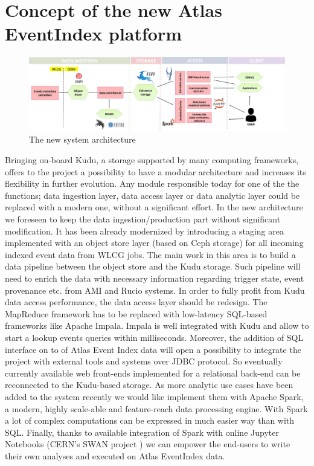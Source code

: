 \documentclass{webofc}
\begin{document}
\section{Concept of the new Atlas EventIndex platform}
\label{sec-4}
\begin{figure}[h]
\centering
\includegraphics[width=\linewidth,clip]{architecture.jpg}
\caption{The new system architecture}
\label{fig:arch}
\end{figure}
Bringing on-board Kudu, a storage supported by many computing frameworks, offers to the project a possibility to have a modular architecture and increases its flexibility in further evolution. Any module responsible today for one of the the functions; data ingestion layer, data access layer or data analytic layer could be replaced with a modern one, without a significant effort. \newline
In the new architecture we foreseen to keep the data ingestion/production part without significant modification. It has been already modernized by introducing a staging area implemented with an object store layer \cite{CEPH} (based on Ceph storage) for all incoming indexed event data from WLCG \cite{WCG} jobs. The main work in this area is to build a data pipeline between the object store and the Kudu storage. Such pipeline will need to enrich the data with necessary information regarding trigger state, event provenance etc. from AMI \cite{AMI} and Rucio \cite{Rucio} systems. \newline
In order to fully profit from Kudu data access performance, the data access layer should be redesign. The MapReduce framework has to be replaced with low-latency SQL-based frameworks like Apache Impala. Impala is well integrated with Kudu and allow to start a lookup events queries within milliseconds. Moreover, the addition of SQL interface on to of Atlas Event Index data will open a possibility to integrate the project with external tools and systems over JDBC protocol. So eventually currently available web front-ends implemented for a relational back-end can be reconnected to the Kudu-based storage. \newline 
As more analytic use cases have been added to the system recently we would like implement them with Apache Spark, a modern, highly scale-able and feature-reach data processing engine. With Spark a lot of complex computations can be expressed in much easier way than with SQL. Finally, thanks to available integration of Spark with online Jupyter Notebooks (CERN's SWAN project \cite{SWAN}) we can empower the end-users to write their own analyses and executed on Atlas EventIndex data.
\end{document}
